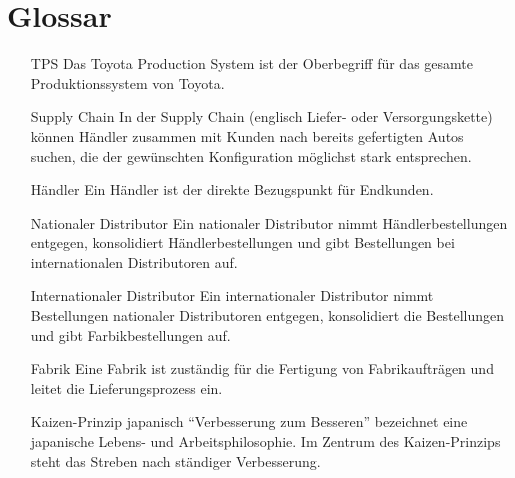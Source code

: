 \documentclass[a4paper,10pt,left=4.5cm,right=3cm,top=1cm,bottom=2cm]{article}
\begin{document}
\section{Glossar}

\begin{itemize}
  \item[TPS] Das Toyota Production System ist der Oberbegriff für das gesamte Produktionssystem von Toyota.
  \item[Supply Chain] In der Supply Chain (englisch Liefer- oder Versorgungskette) können Händler zusammen mit Kunden nach bereits gefertigten Autos suchen, die der gewünschten Konfiguration möglichst stark entsprechen.
  \item[Händler] Ein Händler ist der direkte Bezugspunkt für Endkunden.
  \item[Nationaler Distributor] Ein nationaler Distributor nimmt Händlerbestellungen entgegen, konsolidiert Händlerbestellungen und gibt Bestellungen bei internationalen Distributoren auf.
  \item[Internationaler Distributor] Ein internationaler Distributor nimmt Bestellungen nationaler Distributoren entgegen, konsolidiert die Bestellungen und gibt Farbikbestellungen auf.
  \item[Fabrik] Eine Fabrik ist zuständig für die Fertigung von Fabrikaufträgen und leitet die Lieferungsprozess ein.
  \item[Kaizen-Prinzip] japanisch "`Verbesserung zum Besseren"' bezeichnet eine japanische Lebens- und Arbeitsphilosophie. Im Zentrum des Kaizen-Prinzips steht das Streben nach ständiger Verbesserung.
\end{itemize}
\end{document}
